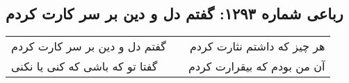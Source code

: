 \begin{center}
\section*{رباعی شماره ۱۲۹۳: گفتم دل و دین بر سر کارت کردم}
\label{sec:1293}
\begin{longtable}{l p{0.5cm} r}
گفتم دل و دین بر سر کارت کردم
&&
هر چیز که داشتم نثارت کردم
\\
گفتا تو که باشی که کنی یا نکنی
&&
آن من بودم که بیقرارت کردم
\\
\end{longtable}
\end{center}
